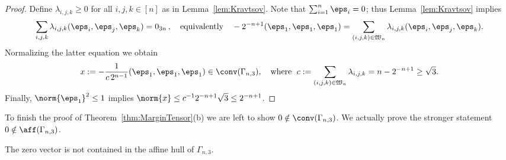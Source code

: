 \begin{proof}
Define $\lambda_{i,j,k} \geq 0$ for all $i,j,k \in [n]$ as in Lemma~\ref{lem:Kravtsov}. Note that $\sum_{i = 1}^n \eps_i = 0$; thus Lemma~\ref{lem:Kravtsov} implies
	\begin{align*}
	\sum_{i,j,k} \lambda_{i,j,k} (\eps_i,\eps_j,\eps_k) = 0_{3n} \, , \quad \text{equivalently} \quad
	-2^{-n+1}(\eps_1,\eps_1,\eps_1) = \sum_{(i,j,k) \in \mathfrak{W}_n} \lambda_{i,j,k}(\eps_i,\eps_j,\eps_k).
	\end{align*}
Normalizing the latter equation we obtain
	\begin{align*}
	x:= -\frac{1}{c \, 2^{n-1}} (\eps_1,\eps_1,\eps_1) \in \conv(\Gamma_{n,3}), \quad \text{where }\;
	c := \sum_{(i,j,k)\in \mathfrak{W}_n} \lambda_{i,j,k} = n-2^{-n+1} \geq \sqrt{3}.
	\end{align*}
Finally, $\norm{\eps_1}^2 \leq 1$ implies $\norm{x} \leq c^{-1} 2^{-n+1} \sqrt{3} \leq 2^{-n+1}$.
\end{proof}

To finish the proof of Theorem~\ref{thm:MarginTensor}(b) we are left to show $0 \notin \conv(\Gamma_{n,3})$. We actually prove the stronger statement $0 \notin \aff(\Gamma_{n,3})$.

\begin{lem}\label{lem:affineHullKravtsov}
The zero vector is not contained  in the affine hull of $\Gamma_{n,3}$.
\end{lem}

